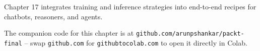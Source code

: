 \begin{chapterenv}
\begin{tipbox}
Chapter 17 integrates training and inference strategies into end-to-end recipes for chatbots, reasoners, and agents.
\end{tipbox}


The companion code for this chapter is at \texttt{github.com/arunpshankar/packt-final} -- swap \texttt{github.com} for \texttt{githubtocolab.com} to open it directly in Colab.

\end{chapterenv}